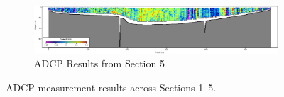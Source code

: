 \begin{figure}[H]
    \begin{subfigure}{\linewidth}
        \includegraphics[width=\linewidth]{figures/appendix-h/section5.png}
        \caption{ADCP Results from Section 5}
        \label{fig:adcp_results_5}
    \end{subfigure}

    \caption{ADCP measurement results across Sections 1–5.}
    \label{fig:adcp_results_all}
\end{figure}

